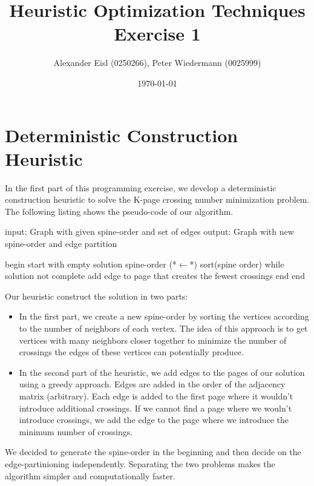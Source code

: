 \documentclass{scrartcl}
\author{Alexander Eisl (0250266), Peter Wiedermann (0025999)}
\date{\today}
\title{Heuristic Optimization Techniques \\ Exercise 1}
\begin{document}
\maketitle


\section{Deterministic Construction Heuristic}
\label{sec:deterministic}
In the first part of this programming exercise, we develop a
deterministic construction heuristic to solve the K-page crossing
number minimization problem. The following listing shows the
pseudo-code of our algorithm.

\begin{algorithm}[caption={Deterministic construction heuristic}]
    input: Graph with given spine-order and set of edges
    output: Graph with new spine-order and edge partition

    begin
       start with empty solution
       spine-order (*$\leftarrow$*) sort(spine order)
       while solution not complete
           add edge to page that creates the fewest crossings
       end 
    end
\end{algorithm}

Our heuristic construct the solution in two parts:

\begin{itemize}
\item In the first part, we create a new spine-order by sorting the
  vertices according to the number of neighbors of each vertex. The
  idea of this approach is to get vertices with many neighbors closer
  together to minimize the number of crossings the edges of these
  vertices can potentially produce.

\item In the second part of the heuristic, we add edges to the pages
  of our solution using a greedy approach. Edges are added in the
  order of the adjacency matrix (arbitrary).  Each edge is added to
  the first page where it wouldn't introduce additional crossings.  If
  we cannot find a page where we wouln't introduce crossings, we add
  the edge to the page where we introduce the minimum number of
  crossings.
\end{itemize}

We decided to generate the spine-order in the beginning and then
decide on the edge-partinioning independently. Separating the two
problems makes the algorithm simpler and computationally faster.
\end{document}
